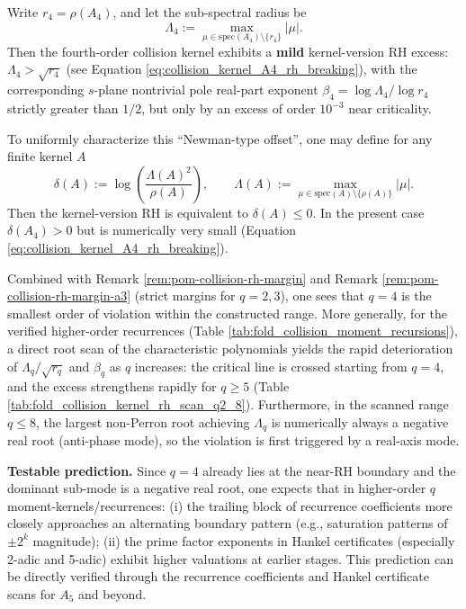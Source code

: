 \begin{remark}\label{rem:pom-collision-rh-break-a4}
Write \(r_4=\rho(A_4)\), and let the sub-spectral radius be
\[
\Lambda_4:=\max_{\mu\in\mathrm{spec}(A_4)\setminus\{r_4\}}|\mu|.
\]
 Then the fourth-order collision kernel exhibits a \textbf{mild} kernel-version RH excess: \(\Lambda_4>\sqrt{r_4}\) (see Equation \ref{eq:collision_kernel_A4_rh_breaking}), with the corresponding \(s\)-plane nontrivial pole real-part exponent
\(
\beta_4=\log\Lambda_4/\log r_4
\)
 strictly greater than \(1/2\), but only by an excess of order \(10^{-3}\) near criticality.
\par
To uniformly characterize this ``Newman-type offset'', one may define for any finite kernel \(A\)
\[
\delta(A):=\log\!\left(\frac{\Lambda(A)^2}{\rho(A)}\right),
\qquad
\Lambda(A):=\max_{\mu\in\mathrm{spec}(A)\setminus\{\rho(A)\}}|\mu|.
\]
Then the kernel-version RH is equivalent to \(\delta(A)\le 0\). In the present case \(\delta(A_4)>0\) but is numerically very small (Equation \ref{eq:collision_kernel_A4_rh_breaking}).
\par
Combined with Remark \ref{rem:pom-collision-rh-margin} and Remark \ref{rem:pom-collision-rh-margin-a3} (strict margins for \(q=2,3\)), one sees that \(q=4\) is the smallest order of violation within the constructed range.
More generally, for the verified higher-order recurrences (Table \ref{tab:fold_collision_moment_recursions}), a direct root scan of the characteristic polynomials yields the rapid deterioration of
\(\Lambda_q/\sqrt{r_q}\) and \(\beta_q\) as \(q\) increases: the critical line is crossed starting from \(q=4\), and the excess strengthens rapidly for \(q\ge 5\) (Table \ref{tab:fold_collision_kernel_rh_scan_q2_8}).
Furthermore, in the scanned range \(q\le 8\), the largest non-Perron root achieving \(\Lambda_q\) is numerically always a negative real root (anti-phase mode), so the violation is first triggered by a real-axis mode.
\par
\textbf{Testable prediction.} Since \(q=4\) already lies at the near-RH boundary and the dominant sub-mode is a negative real root, one expects that in higher-order \(q\) moment-kernels/recurrences:
(i) the trailing block of recurrence coefficients more closely approaches an alternating boundary pattern (e.g., saturation patterns of \(\pm 2^k\) magnitude);
(ii) the prime factor exponents in Hankel certificates (especially 2-adic and 5-adic) exhibit higher valuations at earlier stages.
This prediction can be directly verified through the recurrence coefficients and Hankel certificate scans for \(A_5\) and beyond.
\end{remark}

